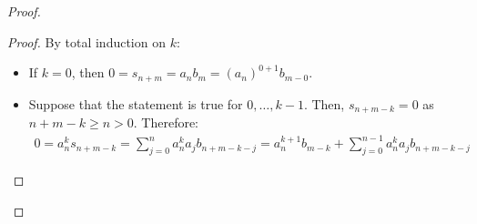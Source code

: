 \begin{problem}
\begin{enumerate}[label=(\theproblem.\arabic*),ref=\theproblem.\arabic*]
\begin{sol}
\begin{proof}
\begin{itemize}
\begin{claim}
                            \begin{proof}
                                By total induction on $k$:
                                \begin{itemize}
                                    \item If $k = 0$, then $0 = s_{n+m} = a_n b_m = (a_n)^{0+1}b_{m-0}$.
                                    \item Suppose that the statement is true for $0, \ldots, k-1$.
                                    Then, $s_{n+m-k} = 0$ as $n+m-k \geq n > 0$.
                                    Therefore:
                                        \begin{align*}
                                            0 = a_n^k s_{n+m-k} = \sum_{j=0}^{n} a_n^k a_j b_{n+m-k-j} = a_n^{k+1} b_{m-k} + \sum_{j=0}^{n-1} a_n^k a_j b_{n+m-k-j}
                                        \end{align*}


\end{itemize}
\end{proof}
\end{claim}
\end{itemize}
\end{proof}
\end{sol}
\end{enumerate}
\end{problem}
